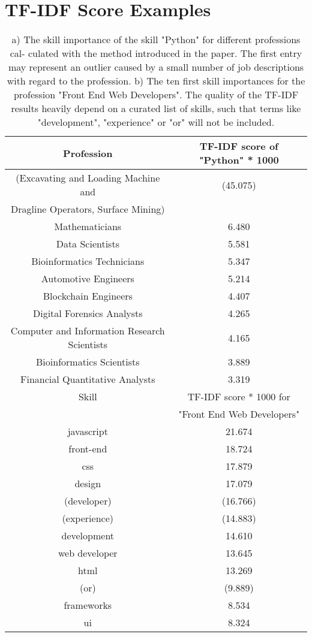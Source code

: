 
\chapter{TF-IDF Score Examples}
\label{ch:tfidfappendixw}
\begin{table}[htbp]
\centering
\setlength\tabcolsep{3pt}
\begin{tabular}{|c|c|}
\hline
Profession & TF-IDF score of "Python" * 1000 \\
\hline
(Excavating and Loading Machine and & (45.075)\\ Dragline Operators, Surface Mining) &  \\
Mathematicians & 6.480 \\
Data Scientists & 5.581 \\
Bioinformatics Technicians & 5.347 \\
Automotive Engineers & 5.214 \\
Blockchain Engineers & 4.407 \\
Digital Forensics Analysts & 4.265 \\
Computer and Information Research Scientists & 4.165 \\
Bioinformatics Scientists & 3.889 \\
Financial Quantitative Analysts & 3.319 \\


\hline
Skill & TF-IDF score * 1000 for \\
& "Front End Web Developers" \\
\hline
javascript & 21.674 \\
front-end & 18.724 \\
css & 17.879 \\
design & 17.079 \\
(developer) & (16.766) \\
(experience) & (14.883) \\
development & 14.610 \\
web developer & 13.645 \\
html & 13.269\\
(or) & (9.889) \\
frameworks & 8.534 \\
ui & 8.324 \\

\hline
\end{tabular}
\caption[Term Frequency Inverse Document Frequency examples]{
a) The skill importance of the skill "Python" for different professions cal-
culated with the method introduced in the paper. The first entry may
represent an outlier caused by a small number of job descriptions with
regard to the profession. b) The ten first skill importances for the profession "Front End Web Developers". The quality of the TF-IDF results heavily depend on a curated list of skills, such that terms like "development", "experience" or "or" will not be included.
}

\label{tab:tfidf}
\end{table}


